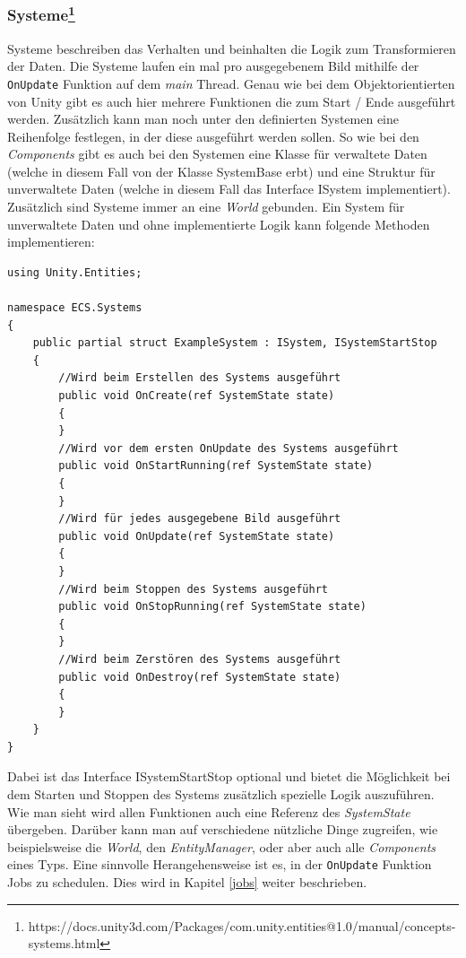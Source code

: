 \documentclass[12pt, titlepage]{article}
\DeclareRobustCommand{\#}{\adjustbox{valign=B,totalheight=.57\baselineskip}{\oldhash}}%
\begin{document}
\subsubsection{Systeme\footnote{https://docs.unity3d.com/Packages/com.unity.entities@1.0/manual/concepts-systems.html}}
Systeme beschreiben das Verhalten und beinhalten die Logik zum Transformieren der Daten. Die Systeme laufen ein mal pro ausgegebenem Bild mithilfe der \texttt{OnUpdate} Funktion auf dem \textit{main} Thread. Genau wie bei dem Objektorientierten von Unity gibt es auch hier mehrere Funktionen die zum Start / Ende ausgeführt werden. Zusätzlich kann man noch unter den definierten Systemen eine Reihenfolge festlegen, in der diese ausgeführt werden sollen. So wie bei den \textit{Components} gibt es auch bei den Systemen eine Klasse für verwaltete Daten (welche in diesem Fall von der Klasse SystemBase erbt) und eine Struktur für unverwaltete Daten (welche in diesem Fall das Interface ISystem implementiert). Zusätzlich sind Systeme immer an eine \textit{World} gebunden. Ein System für unverwaltete Daten und ohne implementierte Logik kann folgende Methoden implementieren:
\begin{lstlisting}[style=code, caption={System Beispiel}]
using Unity.Entities;

namespace ECS.Systems
{
    public partial struct ExampleSystem : ISystem, ISystemStartStop
    {
        //Wird beim Erstellen des Systems ausgeführt
        public void OnCreate(ref SystemState state)
        {
        }
        //Wird vor dem ersten OnUpdate des Systems ausgeführt
        public void OnStartRunning(ref SystemState state)
        {
        }
        //Wird für jedes ausgegebene Bild ausgeführt
        public void OnUpdate(ref SystemState state)
        {
        }
        //Wird beim Stoppen des Systems ausgeführt
        public void OnStopRunning(ref SystemState state)
        {
        }
        //Wird beim Zerstören des Systems ausgeführt
        public void OnDestroy(ref SystemState state)
        {
        }
    }
}
\end{lstlisting}
Dabei ist das Interface ISystemStartStop optional und bietet die Möglichkeit bei dem Starten und Stoppen des Systems zusätzlich spezielle Logik auszuführen. Wie man sieht wird allen Funktionen auch eine Referenz des \textit{SystemState} übergeben. Darüber kann man auf verschiedene nützliche Dinge zugreifen, wie beispielsweise die \textit{World}, den \textit{EntityManager}, oder aber auch alle \textit{Components} eines Typs. Eine sinnvolle Herangehensweise ist es, in der \texttt{OnUpdate} Funktion Jobs zu schedulen. Dies wird in Kapitel \ref{jobs} weiter beschrieben.
\end{document}
